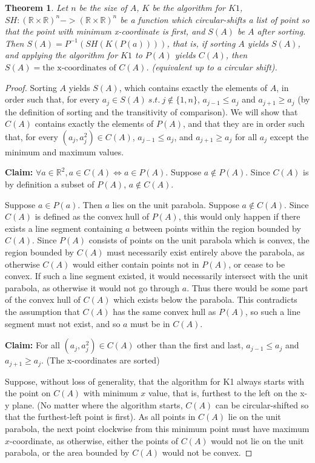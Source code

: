\documentclass[11pt]{article}
\newtheorem{thm}{Theorem}
\begin{document}
\begin{thm}
    \label{thm:soln-map}
    Let $n$ be the size of $A$, $K$ be the algorithm for $K1$, $SH: (\mathbb{R} \times \mathbb{R})^n -> (\mathbb{R} \times \mathbb{R})^n$ be a function which circular-shifts a list of point so that the point with minimum x-coordinate is first, and $S(A)$ be $A$ after sorting. Then $S(A) = P^{-1}(SH(K(P(a))))$, that is, 
    if sorting $A$ yields $S(A)$, and applying the algorithm for $K1$ to $P(A)$ yields $C(A)$, then $S(A) = \text{the x-coordinates of } C(A)$. (equivalent up to a circular shift).
\end{thm}
\begin{proof}
    Sorting $A$ yields $S(A)$, which contains exactly the elements of $A$, in order such that, for every $a_j \in S(A) \ s.t. \  j \notin \{1, n\}$, $a_{j-1} \leq a_j$ and $a_{j+1} \geq a_j$ (by the definition of sorting and the transitivity of comparison). We will show that $C(A)$ contains exactly the elements of $P(A)$, and that they are in order such that, for every $(a_j, a_j^2) \in C(A)$, $a_{j-1} \leq a_j$, and $a_{j+1} \geq a_j$ for all $a_j$ except the minimum and maximum values.

    \textbf{Claim: } $\forall a \in \mathbb{R}^2, a \in C(A) \iff a \in P(A)$.
    Suppose $a \notin P(A)$. Since $C(A)$ is by definition a subset of $P(A)$, $a \notin C(A)$. 

    Suppose $a \in P(a)$. Then $a$ lies on the unit parabola. Suppose $a \notin C(A)$. Since $C(A)$ is defined as the convex hull of $P(A)$, this would only happen if there exists a line segment containing $a$ between points within the region bounded by $C(A)$. Since $P(A)$ consists of points on the unit parabola which is convex, the region bounded by $C(A)$ must necessarily exist entirely above the parabola, as otherwise $C(A)$ would either contain points not in $P(A)$, or cease to be convex. If such a line segment existed, it would necessarily intersect with the unit parabola, as otherwise it would not go through $a$. Thus there would be some part of the convex hull of $C(A)$ which exists below the parabola. This contradicts the assumption that $C(A)$ has the same convex hull as $P(A)$, so such a line segment must not exist, and so $a$ must be in $C(A)$. 

    \textbf{Claim: } For all $(a_j, a_j^2) \in C(A)$ other than the first and last, $a_{j-1} \leq a_j$ and $a_{j+1} \geq a_j$. (The x-coordinates are sorted)

    Suppose, without loss of generality, that the algorithm for K1 always starts with the point on $C(A)$ with minimum $x$ value, that is, furthest to the left on the x-y plane. (No matter where the algorithm starts, $C(A)$ can be circular-shifted so that the furthest-left point is first). As all points in $C(A)$ lie on the unit parabola, the next point clockwise from this minimum point must have maximum $x$-coordinate, as otherwise, either the points of $C(A)$ would not lie on the unit parabola, or the area bounded by $C(A)$ would not be convex.


\end{proof}
\end{document}
